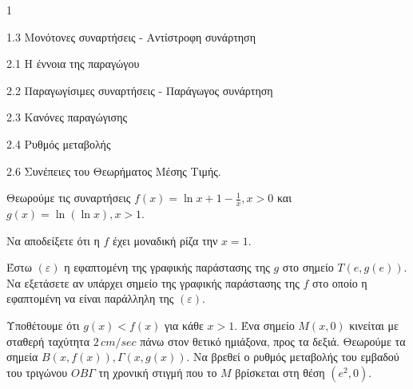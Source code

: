 \begin{ylh}{1}
    \item 1.3 Μονότονες συναρτήσεις - Αντίστροφη συνάρτηση
    \item 2.1 Η έννοια της παραγώγου
    \item 2.2 Παραγωγίσιμες συναρτήσεις - Παράγωγος συνάρτηση
    \item 2.3 Κανόνες παραγώγισης
    \item 2.4 Ρυθμός μεταβολής
    \item 2.6 Συνέπειες του Θεωρήματος Μέσης Τιμής.
\end{ylh}
Θεωρούμε τις συναρτήσεις $f(x) = \ln x + 1 - \frac{1}{x}, x > 0$ και $g(x) = \ln(\ln x), x > 1$.
\begin{alist}
\item Να αποδείξετε ότι η $f$ έχει μοναδική ρίζα την $x=1$. 
\item Έστω $(\varepsilon)$ η εφαπτομένη της γραφικής παράστασης της $g$ στο σημείο $T(e,g(e))$. Να εξετάσετε αν υπάρχει σημείο της γραφικής παράστασης της $f$ στο οποίο η εφαπτομένη να είναι παράλληλη της $(\varepsilon)$. 
\item Υποθέτουμε ότι $g(x) < f(x)$ για κάθε $x > 1$. Ένα σημείο $M(x,0)$ κινείται με σταθερή ταχύτητα $2 \, cm/sec$ πάνω στον θετικό ημιάξονα, προς τα δεξιά. Θεωρούμε τα σημεία $B(x,f(x)), \Gamma(x,g(x))$. Να βρεθεί ο ρυθμός μεταβολής του εμβαδού του τριγώνου $OB\Gamma$ τη χρονική στιγμή που το $M$ βρίσκεται στη θέση $(e^2,0)$. 
\end{alist}